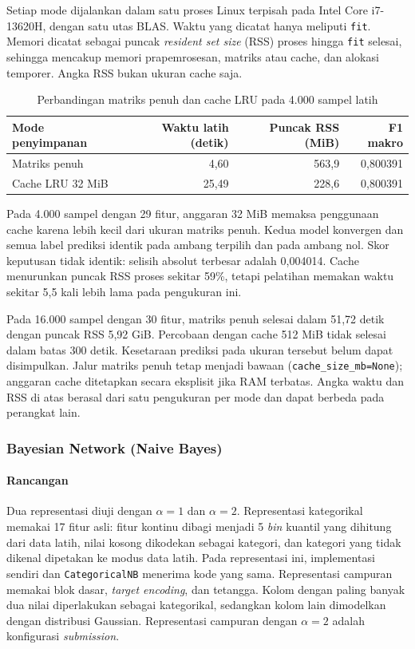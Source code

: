 Setiap mode dijalankan dalam satu proses Linux terpisah pada Intel Core
i7-13620H, dengan satu utas BLAS. Waktu yang dicatat hanya meliputi
\texttt{fit}. Memori dicatat sebagai puncak \textit{resident set size} (RSS)
proses hingga \texttt{fit} selesai, sehingga mencakup memori prapemrosesan,
matriks atau cache, dan alokasi temporer. Angka RSS bukan ukuran cache saja.

\begin{table}[H]
\centering
\small
\caption{Perbandingan matriks penuh dan cache LRU pada 4.000 sampel latih}
\label{tab:svm-cache}
\begin{tabular}{@{}lrrr@{}}
\toprule
Mode penyimpanan & Waktu latih (detik) & Puncak RSS (MiB) & F1 makro \\
\midrule
Matriks penuh & 4,60 & 563,9 & 0,800391 \\
Cache LRU 32 MiB & 25,49 & 228,6 & 0,800391 \\
\bottomrule
\end{tabular}
\end{table}

Pada 4.000 sampel dengan 29 fitur, anggaran 32 MiB memaksa penggunaan
cache karena lebih kecil dari ukuran matriks penuh.
Kedua model konvergen dan semua label prediksi identik pada ambang terpilih
dan pada ambang nol. Skor keputusan tidak identik: selisih absolut terbesar
adalah 0,004014. Cache menurunkan puncak RSS proses sekitar 59\%, tetapi
pelatihan memakan waktu sekitar 5,5 kali lebih lama pada pengukuran ini.

Pada 16.000 sampel dengan 30 fitur, matriks penuh selesai dalam 51,72 detik
dengan puncak RSS 5,92 GiB. Percobaan dengan cache 512 MiB tidak
selesai dalam batas 300 detik. Kesetaraan prediksi pada ukuran tersebut
belum dapat disimpulkan. Jalur matriks penuh tetap menjadi bawaan
(\texttt{cache\_size\_mb=None}); anggaran cache ditetapkan secara eksplisit
jika RAM terbatas. Angka waktu dan RSS di atas berasal dari satu pengukuran
per mode dan dapat berbeda pada perangkat lain.

\subsubsection{Bayesian Network (Naive Bayes)}

\paragraph{Rancangan}
Dua representasi diuji dengan $\alpha=1$ dan $\alpha=2$. Representasi
kategorikal memakai 17 fitur asli: fitur kontinu dibagi menjadi 5
\textit{bin} kuantil yang dihitung dari data latih, nilai kosong dikodekan
sebagai kategori, dan kategori yang tidak dikenal dipetakan ke modus data
latih. Pada representasi ini, implementasi sendiri dan \texttt{CategoricalNB}
menerima kode yang sama. Representasi campuran memakai blok dasar,
\textit{target encoding}, dan tetangga. Kolom dengan paling banyak dua nilai
diperlakukan sebagai kategorikal, sedangkan kolom lain dimodelkan dengan
distribusi Gaussian. Representasi campuran dengan $\alpha=2$ adalah
konfigurasi \textit{submission}.


